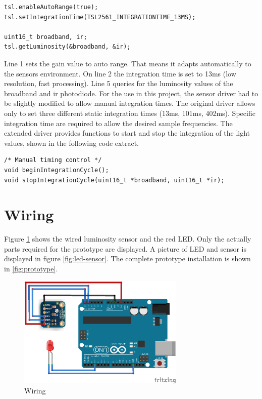 \documentclass[notitlepage]{scrreprt}
\begin{document}
\begin{lstlisting}[caption=Adafruit driver]
tsl.enableAutoRange(true);
tsl.setIntegrationTime(TSL2561_INTEGRATIONTIME_13MS);

uint16_t broadband, ir;
tsl.getLuminosity(&broadband, &ir);
\end{lstlisting}

Line 1 sets the gain value to auto range. That means it adapts automatically to the sensors environment. On line 2 the integration time is set to 13ms (low resolution, fast processing). Line 5 queries for the luminosity values of the broadband and ir photodiode. For the use in this project, the sensor driver had to be slightly modified to allow manual integration times. The original driver allows only to set three different static integration times (13ms, 101ms, 402ms). Specific integration time are required to allow the desired sample frequencies. The extended driver provides functions to start and stop the integration of the light values, shown in the following code extract.

\begin{lstlisting}[caption=Adafruit\_TSL2561\_U.h]
/* Manual timing control */
void beginIntegrationCycle();
void stopIntegrationCycle(uint16_t *broadband, uint16_t *ir);
\end{lstlisting}

\newpage

\section{Wiring}
\label{sec:wiring}
Figure \ref{fig:wiring} shows the wired luminosity sensor and the red LED. Only the actually parts required for the prototype are displayed. A picture of LED and sensor is displayed in figure \ref{fig:led-sensor}. The complete prototype installation is shown in \ref{fig:prototype}.

\begin{figure}[H]
	\centering
	\includegraphics[width=300px]{images/wiring.png}
	\caption{Wiring}
	\label{fig:wiring}
\end{figure}
\end{document}
